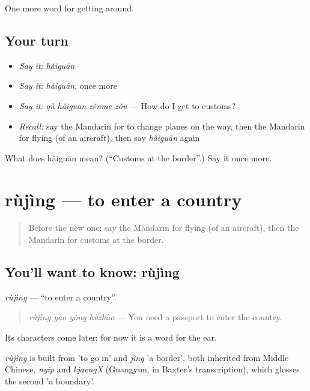 \begin{grammarlens}[title={What you've built}]
One more word for getting around.
\end{grammarlens}

\subsection*{Your turn}
\begin{itemize}
\raggedright
  \item \emph{Say it:} \emph{hǎiguān}
  \item \emph{Say it:} \emph{hǎiguān}, once more
  \item \emph{Say it:} \emph{qù hǎiguān zěnme zǒu} — How do I get to customs?
  \item \emph{Recall:} say the Mandarin for to change planes on the way, then the Mandarin for flying (of an aircraft), then say \emph{hǎiguān} again
\end{itemize}

\begin{tcolorbox}[breakable,colback=teal!4,colframe=teal!35!black,title={Before you move on}]
What does hǎiguān mean? (\textquotedblleft{}Customs at the border\textquotedblright{}.) Say it once more.
\end{tcolorbox}
\section[rùjìng]{rùjìng — to enter a country}

\label{lesson:ZH-C417-rujing}



\begin{quote}
Before the new one: say the Mandarin for flying (of an aircraft), then the Mandarin for customs at the border.
\end{quote}

\subsection*{You'll want to know: rùjìng}
\emph{rùjìng} — \textquotedblleft{}to enter a country\textquotedblright{}.

\begin{quote}
\emph{rùjìng yào yòng hùzhào} — You need a passport to enter the country.
\end{quote}

Its characters come later; for now it is a word for the ear.

\begin{cousinweb}
\emph{rùjìng} is built from  'to go in' and \emph{jìng} 'a border', both inherited from Middle Chinese, \emph{nyip} and \emph{kjaengX} (Guangyun, in Baxter's transcription), which glosses the second 'a boundary'.
\end{cousinweb}

